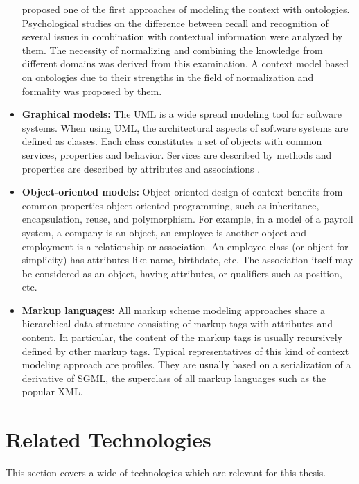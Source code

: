 \begin{itemize}
\citeauthor{Oeztuerk97towardsa} proposed one of the first approaches of modeling the context with ontologies. Psychological studies on the difference between recall and recognition of several issues in combination with contextual information were analyzed by them. The necessity of normalizing and combining the knowledge from different domains was derived from this examination. A context model based on ontologies due to their strengths in the field of normalization and formality was proposed by them.

\item \textbf{Graphical models:} 
The \ac{UML} is a wide spread modeling tool for software systems. When using \ac{UML}, the architectural aspects of software systems are defined as classes. Each class constitutes a set of objects with common services, properties and behavior. Services are described by methods and properties are described by attributes and associations \cite{Sheng2005}.

\item \textbf{Object-oriented models:} Object-oriented design of context benefits from common properties object-oriented programming, such as inheritance, encapsulation, reuse, and polymorphism. For example, in a model of a payroll system, a company is an object, an employee is another object and employment is a relationship or association. An employee class (or object for simplicity) has attributes like name, birthdate, etc. The association itself may be considered as an object, having attributes, or qualifiers such as position, etc\cite{pSkills:Object-oriented_modeling}.

\item \textbf{Markup languages: } All markup scheme modeling approaches share a hierarchical data structure consisting of markup tags with attributes and content. In particular, the content of the markup tags is usually recursively defined by other markup tags. Typical representatives of this kind of context modeling approach are profiles. They are usually based on a serialization of a derivative of \ac{SGML}, the superclass of all markup languages such as the popular \ac{XML}\cite{Strang2004}.

\end{itemize}

\section{Related Technologies\label{sec:back_rel_tech}}
This section covers a wide of technologies which are relevant for this thesis.	

